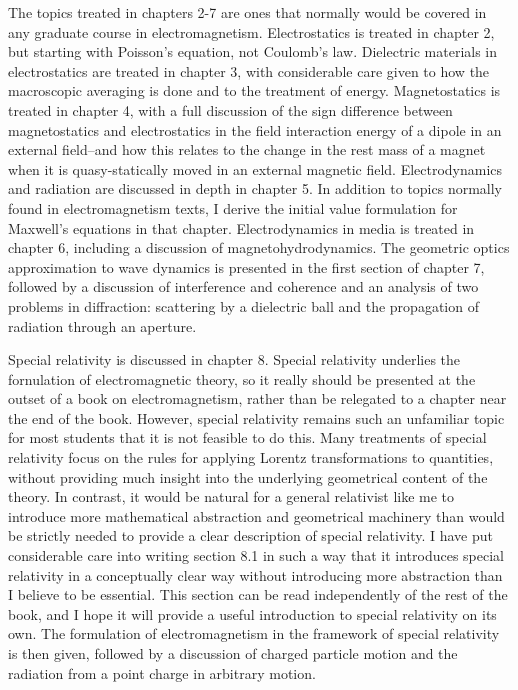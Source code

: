 The topics treated in chapters 2-7 are ones that normally would be covered in any graduate course in electromagnetism. Electrostatics is treated in chapter 2, but starting with Poisson's equation, not Coulomb's law. Dielectric materials in electrostatics are treated in chapter 3, with considerable care given to how the macroscopic averaging is done and to the treatment of energy. Magnetostatics is treated in chapter 4, with a full discussion of the sign difference between magnetostatics and electrostatics in the field interaction energy of a dipole in an external field--and how this relates to the change in the rest mass of a magnet when it is quasy-statically moved in an external magnetic field. Electrodynamics and radiation are discussed in depth in chapter 5. In addition to topics normally found in electromagnetism texts, I derive the initial value formulation for Maxwell's equations in that chapter. Electrodynamics in media is treated in chapter 6, including a discussion of magnetohydrodynamics. The geometric optics approximation to wave dynamics is presented in the first section of chapter 7, followed by a discussion of interference and coherence and an analysis of two problems in diffraction: scattering by a dielectric ball and the propagation of radiation through an aperture.

Special relativity is discussed in chapter 8. Special relativity underlies the fornulation of electromagnetic theory, so it really should be presented at the outset of a book on electromagnetism, rather than be relegated to a chapter near the end of the book. However, special relativity remains such an unfamiliar topic for most students that it is not feasible to do this. Many treatments of special relativity focus on the rules for applying Lorentz transformations to quantities, without providing much insight into the underlying geometrical content of the theory. In contrast, it would be natural for a general relativist like me to introduce more mathematical abstraction and geometrical machinery than would be strictly needed to provide a clear description of special relativity. I have put considerable care into writing section 8.1 in such a way that it introduces special relativity in a conceptually clear way without introducing more abstraction than I believe to be essential. This section can be read independently of the rest of the book, and I hope it will provide a useful introduction to special relativity on its own. The formulation of electromagnetism in the framework of special relativity is then given, followed by a discussion of charged particle motion and the radiation from a point charge in arbitrary motion.

